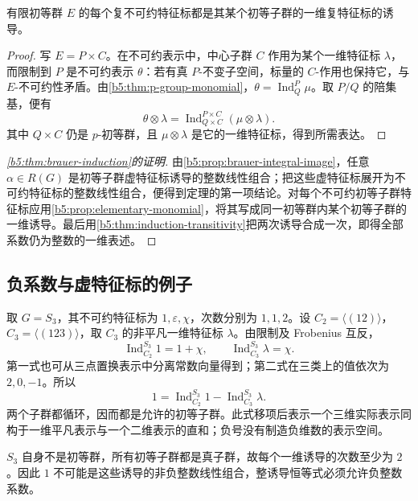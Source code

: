 \begin{proposition}\label{b5:prop:elementary-monomial}
	有限初等群 \(E\) 的每个复不可约特征标都是其某个初等子群的一维复特征标的诱导。
\end{proposition}
\begin{proof}
	写 \(E=P\times C\)。在不可约表示中，中心子群 \(C\) 作用为某个一维特征标 \(\lambda\)，而限制到 \(P\) 是不可约表示 \(\theta\)：若有真 \(P\)-不变子空间，标量的 \(C\)-作用也保持它，与 \(E\)-不可约性矛盾。由\cref{b5:thm:p-group-monomial}，\(\theta=\operatorname{Ind}_Q^P\mu\)。取 \(P/Q\) 的陪集基，便有
	\[
		\theta\otimes\lambda =\operatorname{Ind}_{Q\times C}^{P\times C}(\mu\otimes\lambda).
	\]
	其中 \(Q\times C\) 仍是 \(p\)-初等群，且 \(\mu\otimes\lambda\) 是它的一维特征标，得到所需表达。
\end{proof}

\begin{proof}[\cref{b5:thm:brauer-induction}的证明]
	由\cref{b5:prop:brauer-integral-image}，任意 \(\alpha\in R(G)\) 是初等子群虚特征标诱导的整数线性组合；把这些虚特征标展开为不可约特征标的整数线性组合，便得到定理的第一项结论。对每个不可约初等子群特征标应用\cref{b5:prop:elementary-monomial}，将其写成同一初等群内某个初等子群的一维诱导。最后用\cref{b5:thm:induction-transitivity}把两次诱导合成一次，即得全部系数仍为整数的一维表述。
\end{proof}

\subsection{负系数与虚特征标的例子}
\label{b5:subsec:0504:05}

取 \(G=S_3\)，其不可约特征标为 \(1,\varepsilon,\chi\)，次数分别为 \(1,1,2\)。设 \(C_2=\bigl\langle(12)\bigr\rangle\)，\(C_3=\bigl\langle(123)\bigr\rangle\)，取 \(C_3\) 的非平凡一维特征标 \(\lambda\)。由限制及 Frobenius 互反，
\[
	\operatorname{Ind}_{C_2}^{S_3}1=1+\chi,\qquad \operatorname{Ind}_{C_3}^{S_3}\lambda=\chi.
\]
第一式也可从三点置换表示中分离常数向量得到；第二式在三类上的值依次为 \(2,0,-1\)。所以
\begin{equation}\label{b5:eq:s3-brauer-negative}
	1=\operatorname{Ind}_{C_2}^{S_3}1 -\operatorname{Ind}_{C_3}^{S_3}\lambda.
\end{equation}
两个子群都循环，因而都是允许的初等子群。此式移项后表示一个三维实际表示同构于一维平凡表示与一个二维表示的直和；负号没有制造负维数的表示空间。

\ProseParagraphBreak
\(S_3\) 自身不是初等群，所有初等子群都是真子群，故每个一维诱导的次数至少为 \(2\)。因此 \(1\) 不可能是这些诱导的非负整数线性组合，整诱导恒等式必须允许负整数系数。
